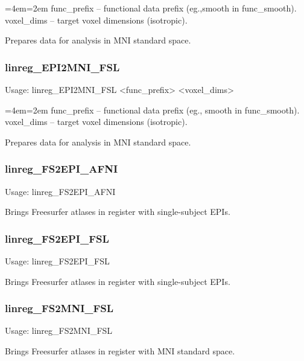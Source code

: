 \documentclass[final,titlepage,letterpaper,oneside,12pt]{article}
\renewcommand{\texttt}[2][BrickRed]{\textcolor{#1}{\ttfamily #2}}%
\newenvironment{blockquote}{%
  \par%
  \medskip
  \leftskip=4em\rightskip=2em%
  \noindent\ignorespaces}{%
  \par\medskip}
\begin{document}
\begin{blockquote}
func\_prefix -- functional data prefix (eg.,smooth in func\_smooth). \\
voxel\_dims -- target voxel dimensions (isotropic). \
\end{blockquote}

\noindent Prepares data for analysis in MNI standard space.

\subsubsection{linreg\_EPI2MNI\_FSL}
Usage: \texttt{linreg\_EPI2MNI\_FSL <func\_prefix> <voxel\_dims>}

\begin{blockquote}
func\_prefix -- functional data prefix (eg., smooth in func\_smooth). \\
voxel\_dims -- target voxel dimensions (isotropic). \
\end{blockquote}

\noindent Prepares data for analysis in MNI standard space.

\subsubsection{linreg\_FS2EPI\_AFNI}
Usage: \texttt{linreg\_FS2EPI\_AFNI}

\noindent Brings Freesurfer atlases in register with single-subject EPIs.

\subsubsection{linreg\_FS2EPI\_FSL}
Usage: \texttt{linreg\_FS2EPI\_FSL}

\noindent Brings Freesurfer atlases in register with single-subject EPIs.

\subsubsection{linreg\_FS2MNI\_FSL}
Usage: \texttt{linreg\_FS2MNI\_FSL}

\noindent Brings Freesurfer atlases in register with MNI standard space.
\end{document}
